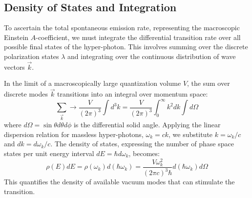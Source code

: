 \subsection{Density of States and Integration}
To ascertain the total spontaneous emission rate, representing the macroscopic Einstein $A$-coefficient, we must integrate the differential transition rate over all possible final states of the hyper-photon. This involves summing over the discrete polarization states $\lambda$ and integrating over the continuous distribution of wave vectors $\vec{k}$.

In the limit of a macroscopically large quantization volume $V$, the sum over discrete modes $\vec{k}$ transitions into an integral over momentum space:
\begin{equation}
    \sum_{\vec{k}} \longrightarrow \frac{V}{(2\pi)^3} \int d^3k = \frac{V}{(2\pi)^3} \int_0^\infty k^2 dk \int d\Omega
\end{equation}
where $d\Omega = \sin\theta d\theta d\phi$ is the differential solid angle. Applying the linear dispersion relation for massless hyper-photons, $\omega_k = ck$, we substitute $k = \omega_k / c$ and $dk = d\omega_k / c$. The density of states, expressing the number of phase space states per unit energy interval $dE = \hbar d\omega_k$, becomes:
\begin{equation}
    \rho(E) dE = \rho(\omega_k) d(\hbar \omega_k) = \frac{V \omega_k^2}{(2\pi c)^3 \hbar} d(\hbar \omega_k) d\Omega
\end{equation}
This quantifies the density of available vacuum modes that can stimulate the transition.

